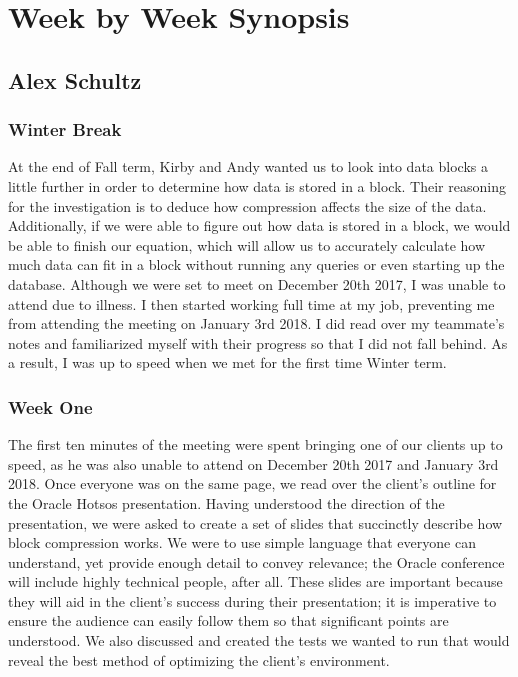 \documentclass[10pt]{article}
\begin{document}
\section{Week by Week Synopsis}
\subsection{Alex Schultz}

\subsubsection{Winter Break}
At the end of Fall term, Kirby and Andy wanted us to look into data blocks a little further in order to determine how data is stored in a block. Their reasoning for the investigation is to deduce how compression affects the size of the data. Additionally, if we were able to figure out how data is stored in a block, we would be able to finish our equation, which will allow us to accurately calculate how much data can fit in a block without running any queries or even starting up the database. Although we were set to meet on December 20th 2017, I was unable to attend due to illness. I then started working full time at my job, preventing me from attending the meeting on January 3rd 2018. I did read over my teammate's notes and familiarized myself with their progress so that I did not fall behind. As a result, I was up to speed when we met for the first time Winter term.

\subsubsection{Week One}
The first ten minutes of the meeting were spent bringing one of our clients up to speed, as he was also unable to attend on December 20th 2017 and January 3rd 2018. Once everyone was on the same page, we read over the client's outline for the Oracle Hotsos presentation. Having understood the direction of the presentation, we were asked to create a set of slides that succinctly describe how block compression works. We were to use simple language that everyone can understand, yet provide enough detail to convey relevance; the Oracle conference will include highly technical people, after all. These slides are important because they will aid in the client's success during their presentation; it is imperative to ensure the audience can easily follow them so that significant points are understood. We also discussed and created the tests we wanted to run that would reveal the best method of optimizing the client's environment. 
\end{document}
